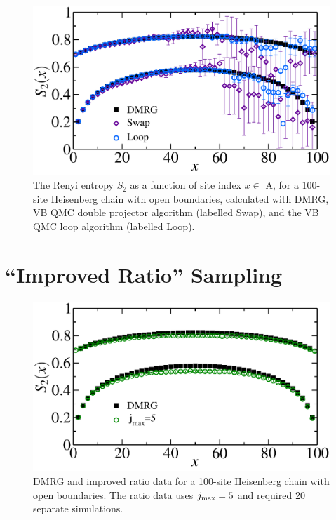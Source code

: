 \begin{figure} {
	\includegraphics[width=6in]{./figures/paper2/fig_1D/loopfig.pdf} 
	\caption[Renyi for a 100-site chain with loop algorithm data]{ 
	\label{loopfig}
The Renyi entropy $S_2$ as a function of site index $x \in $ A, for a 100-site Heisenberg chain with open boundaries, 
calculated with DMRG, VB QMC double projector algorithm (labelled Swap), and the VB QMC loop algorithm (labelled Loop).
}
}\end{figure}


	

\section{``Improved Ratio'' Sampling}


\begin{figure} {
	\includegraphics[width=6in]{./figures/paper2/fig_1D/ratiofig.pdf} 
	\centering
	\caption[Renyi for a 100-site chain with ratio data]{ 
	\label{ratiofig}
	DMRG and improved ratio data for a 100-site Heisenberg chain with open boundaries.
The ratio data uses $j_{\rm max}=5$ and required 20 separate simulations.
	}
}\end{figure}

